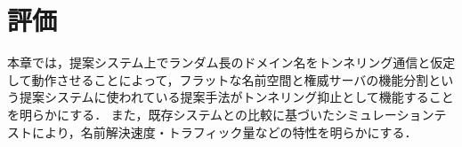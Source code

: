 \section{評価}
\label{sec:evaluation}
%
%


本章では，提案システム上でランダム長のドメイン名をトンネリング通信と仮定して動作させることによって，フラットな名前空間と権威サーバの機能分割という提案システムに使われている提案手法がトンネリング抑止として機能することを明らかにする．
また，既存システムとの比較に基づいたシミュレーションテストにより，名前解決速度・トラフィック量などの特性を明らかにする．

